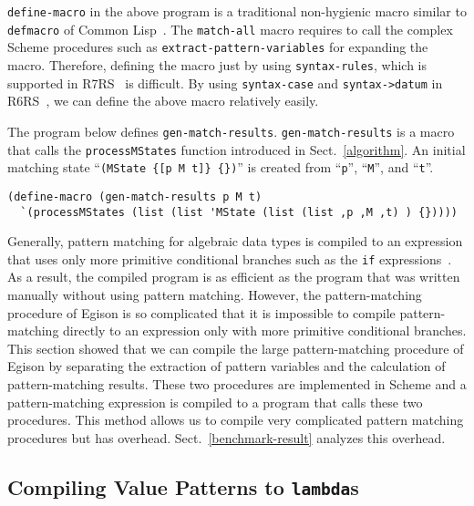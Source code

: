 \documentclass[acmlarge]{acmart}
\newcommand{\new}[1]{\textcolor{blue}{#1}}
\begin{document}
\noindent
\lstinline{define-macro} in the above program is a traditional non-hygienic macro similar to \lstinline{defmacro} of Common Lisp~\cite{gaucheTM}.
The \lstinline{match-all} macro requires to call the complex Scheme procedures such as \lstinline{extract-pattern-variables} for expanding the macro.
Therefore, defining the macro just by using \lstinline{syntax-rules}, which is supported in R7RS~\cite{shinn2013revised} is difficult.
By using \lstinline{syntax-case} and \lstinline{syntax->datum} in R6RS~\cite{sperber2009revised}, we can define the above macro relatively easily.

The program below defines \lstinline{gen-match-results}.
\lstinline{gen-match-results} is a macro that calls the \lstinline{processMStates} function introduced in Sect.~\ref{algorithm}.
An initial matching state ``\lstinline|(MState {[p M t]} {})|'' is created from ``\lstinline{p}'', ``\lstinline{M}'', and ``\lstinline{t}''.

\begin{lstlisting}[language=egison]
(define-macro (gen-match-results p M t)
  `(processMStates (list (list 'MState (list (list ,p ,M ,t) ) {}))))
\end{lstlisting}

\medskip

Generally, pattern matching for algebraic data types is compiled to an expression that uses only more primitive conditional branches such as the \texttt{if} expressions~\cite{peyton1987implementation}.
As a result, the compiled program is as efficient as the program that was written manually without using pattern matching.  
However, the pattern-matching procedure of Egison is so complicated that it is impossible to compile pattern-matching directly to an expression only with more primitive conditional branches.
This section showed that we can compile the large pattern-matching procedure of Egison by separating the extraction of pattern variables and the calculation of pattern-matching results.
These two procedures are implemented in Scheme and a pattern-matching expression is compiled to a program that calls these two procedures.
This method allows us to compile very complicated pattern matching procedures but has overhead.
Sect.~\ref{benchmark-result} analyzes this overhead.

\subsection{Compiling Value Patterns to \lstinline{lambda}s}\label{method-val-pat}
\end{document}
